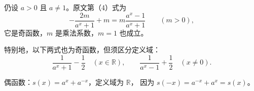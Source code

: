 \begin{frame}[t,label=BcommonP2]
  仍设 $a>0$ 且 $a\ne1$。原文第（4）式为
  \[
    -\frac{2m}{a^x+1}+m
      =m\frac{a^x-1}{a^x+1}\qquad(m>0),
  \]
  它是奇函数，$m$ 是乘法系数，$m=1$ 也成立。
  \pause
  \par 特别地，以下两式也为奇函数，但须区分定义域：
  \[
    \frac1{a^x+1}-\frac12\quad(x\in\mathbb R),\qquad
    \frac1{a^x-1}+\frac12\quad(x\ne0).
  \]
  \pause
  \par 偶函数：$s(x)=a^x+a^{-x}$，定义域为 $\mathbb R$，
  因为 $s(-x)=a^{-x}+a^x=s(x)$。
\end{frame}
